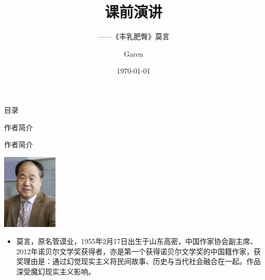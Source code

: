\documentclass[utf-8]{beamer}
\begin{document}
    \title{课前演讲}
    \subtitle{——《丰乳肥臀》莫言}
    \author{Garen}
    \date{\today}

    \titlepage
    \begin{frame}{目录}
        \tableofcontents
    \end{frame}

    \begin{section}{作者简介}
        \begin{frame}{作者简介}
            \begin{center}
                \includegraphics[width=100]{author_image.jpg}
            \end{center}
            \pause
            \begin{flushleft}
              \begin{itemize}
                \item 莫言，原名管谟业，1955年2月17日出生于山东高密，中国作家协会副主席、2012年诺贝尔文学奖获得者，亦是第一个获得诺贝尔文学奖的中国籍作家，获奖理由是：通过幻觉现实主义将民间故事、历史与当代社会融合在一起。作品深受魔幻现实主义影响。%
              \end{itemize}
            \end{flushleft}
        \end{frame}
    \end{section}
\end{document}
